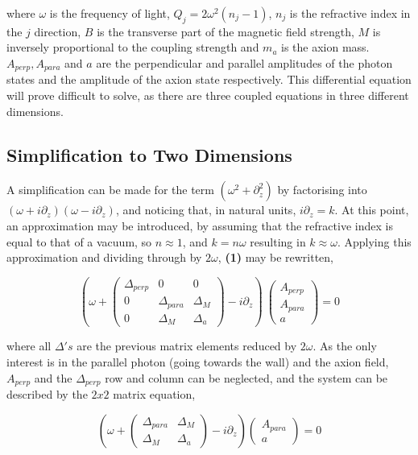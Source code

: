 \documentclass[12pt]{article}
\begin{document}
where $\omega$ is the frequency of light, $Q_{j} = 2\omega^2(n_j-1)$, $n_j$ is the refractive index in the $j$ direction, $B$ is the transverse part of the magnetic field strength, $M$ is inversely proportional to the coupling strength and $m_a$ is the axion mass. $A_{perp}, A_{para}$ and $a$ are the perpendicular and parallel amplitudes of the photon states and the amplitude of the axion state respectively. This differential equation will prove difficult to solve, as there are three coupled equations in three different dimensions.

\subsection{Simplification to Two Dimensions}

A simplification can be made for the term $(\omega^2 + \partial_z^2)$ by factorising into $(\omega+i\partial_z)(\omega-i\partial_z)$, and noticing that, in natural units, $i\partial_z = k$. At this point, an approximation may be introduced, by assuming that the refractive index is equal to that of a vacuum, so $n\approx 1$, and $k=n\omega$ resulting in $k\approx\omega$.
Applying this approximation and dividing through by $2\omega$, \textbf{(1)} may be rewritten, 

\begin{equation}
\left(\omega+\left( \begin{array}{ccc}
\Delta_{perp} & 0 & 0 \\
0 & \Delta_{para} & \Delta_M \\
0 & \Delta_M & \Delta_a \end{array} \right)-i\partial_z\right)\
\left( \begin{array}{c} 
A_{perp} \\ 
A_{para} \\
a \end{array} \right) = 0 
\end{equation}

where all $\Delta's$ are the previous matrix elements reduced by $2\omega$.
As the only interest is in the parallel photon (going towards the wall) and the axion field, $A_{perp}$ and the $\Delta_{perp}$ row and column can be neglected, and the system can be described by the $2x2$ matrix equation, 

\begin{equation}
\left(\omega+\left( \begin{array}{ccc}
\Delta_{para} & \Delta_M \\
\Delta_M & \Delta_a \end{array} \right)
-i\partial_z \right)
\left( \begin{array}{ccc} 
A_{para} \\
a \end{array} \right) = 0
\end{equation}
\end{document}
